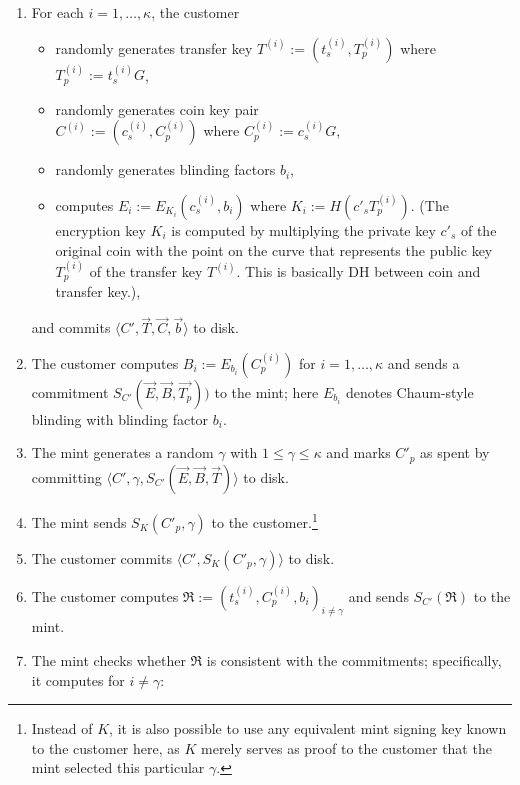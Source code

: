\documentclass{llncs}
\begin{document}
\begin{enumerate}
  \item For each $i = 1,\ldots,\kappa$, the customer
    \begin{itemize}
      \item randomly generates transfer key $T^{(i)} := \left(t^{(i)}_s,T^{(i)}_p\right)$ where $T^{(i)}_p := t^{(i)}_s G$,
      \item randomly generates coin key pair \\ $C^{(i)} := \left(c_s^{(i)}, C_p^{(i)}\right)$ where $C^{(i)}_p := c^{(i)}_s G$,
      \item randomly generates blinding factors $b_i$,
      \item computes $E_i := E_{K_i}\left(c_s^{(i)}, b_i\right)$ where $K_i := H(c'_s T_p^{(i)})$. (The encryption key $K_i$ is
            computed by multiplying the private key $c'_s$ of the original coin with the point on the curve
            that represents the public key $T^{(i)}_p$ of the transfer key $T^{(i)}$. This is basically DH between coin and transfer key.),
    \end{itemize}
    and commits $\langle C', \vec{T}, \vec{C}, \vec{b} \rangle$ to disk.
  \item The customer computes $B_i := E_{b_i}(C^{(i)}_p)$  for $i=1,\ldots,\kappa$ and sends a commitment
    $S_{C'}(\vec{E}, \vec{B}, \vec{T_p}))$ to the mint;
    here $E_{b_i}$ denotes Chaum-style blinding with blinding factor $b_i$.
  \item The mint generates a random $\gamma$ with $1 \le \gamma \le \kappa$ and
    marks $C'_p$ as spent by committing
    $\langle C', \gamma, S_{C'}(\vec{E}, \vec{B}, \vec{T}) \rangle$ to disk.
  \item The mint sends $S_K(C'_p, \gamma)$ to the customer.\footnote{Instead of $K$, it is also
    possible to use any equivalent mint signing key known to the customer here, as $K$ merely
    serves as proof to the customer that the mint selected this particular $\gamma$.}
  \item The customer commits $\langle C', S_K(C'_p, \gamma) \rangle$ to disk.
  \item The customer computes $\mathfrak{R} := \left(t_s^{(i)}, C_p^{(i)}, b_i\right)_{i \ne \gamma}$
        and sends $S_{C'}(\mathfrak{R})$ to the mint.
  \item \label{step:refresh-ccheck} The mint checks whether $\mathfrak{R}$ is consistent with the commitments;
    specifically, it computes for $i \not= \gamma$:


\end{enumerate}
\end{document}
